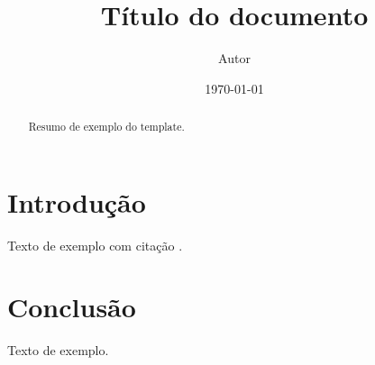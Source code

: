 \documentclass[11pt,a4paper]{article}
\title{Título do documento}
\author{Autor}
\date{\today}
\begin{document}
\maketitle
\begin{abstract}
Resumo de exemplo do template.
\end{abstract}
\section{Introdução}
Texto de exemplo com citação \cite{exemplo2020}.
\section{Conclusão}
Texto de exemplo.


\end{document}
